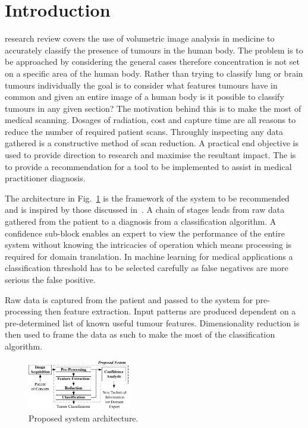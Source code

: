 \documentclass[journal]{IEEEtran}
\begin{document}
\section{Introduction}
 research review covers the use of volumetric image analysis in medicine to accurately classify the presence of tumours in the human body. 
The problem is to be approached by considering the general cases therefore concentration is not set on a specific area of the human body.
Rather than trying to classify lung or brain tumours individually the goal is to consider what features tumours have in common and given an entire image of a human body is it possible to classify tumours in any given section?
The motivation behind this is to make the most of medical scanning.
Dosages of radiation, cost and capture time are all reasons to reduce the number of required patient scans.
Throughly inspecting any data gathered is a constructive method of scan reduction.
A practical end objective is used to provide direction to research and maximise the resultant impact.
The is to provide a recommendation for a tool to be implemented to assist in medical practitioner diagnosis.  

The architecture in Fig.~\ref{fig:Proposed} is the framework of the system to be recommended and is inspired by those discussed in~\cite{ahmed2011efficacy,kumar2011classification,hau07feat,sachdeva2011multiclass,kostis03three}.
A chain of stages leads from raw data gathered from the patient to a diagnosis from a classification algorithm.
A confidence sub-block enables an expert to view the performance of the entire system without knowing the intricacies of operation which means processing is required for domain translation.
In machine learning for medical applications a classification threshold has to be selected carefully as false negatives are more serious the false positive.

Raw data is captured from the patient and passed to the system for pre-processing then feature extraction.
Input patterns are produced dependent on a pre-determined list of known useful tumour features. 
Dimensionality reduction is then used to frame the data as such to make the most of the classification algorithm.

\begin{figure}[!htb]
   \centering
   \includegraphics[width = 0.4\textwidth]{Figures/Proposed.pdf}
   \caption{Proposed system architecture.}
   \label{fig:Proposed}
\end{figure}
\end{document}
